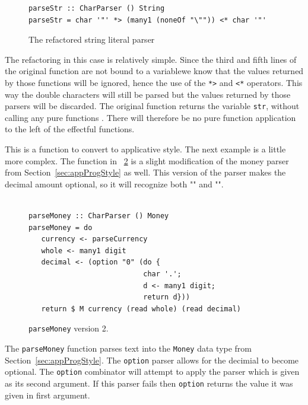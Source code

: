 \begin{figure}[t]
\begin{lstlisting}
parseStr :: CharParser () String
parseStr = char '"' *> (many1 (noneOf "\"")) <* char '"'
\end{lstlisting}
\caption{The refactored string literal parser}
\label{strLit_ref}
\end{figure}

The refactoring in this case is relatively simple. Since the third and fifth lines of the original function are not bound to a variable\DIFaddbegin \DIFadd{, }\DIFaddend we know that the values returned by those functions will be ignored, hence the use of the \texttt{*>} and \texttt{<*} operators. This way the double \DIFdelbegin {}\DIFdelend \DIFaddbegin {}\DIFaddend characters will still be parsed but the values returned by those parsers will be discarded. The original 
function \DIFdelbegin {}\DIFdelend returns the variable \texttt{str}, without calling any pure functions \DIFaddbegin {}\DIFaddend . There will therefore be no pure function application to the left of the effectful functions. 

This is a \DIFdelbegin {}\DIFdelend \DIFaddbegin {}\DIFaddend function to convert to applicative style. The next example is a little more complex. The function in \DIFdelbegin {}\DIFdelend \DIFaddbegin {}\DIFaddend ~\ref{pMoney2} is a slight modification of the money parser from Section~\ref{sec:appProgStyle} as well. This version of the parser makes the decimal amount optional, so it will recognize both "" and "".

\begin{figure}[t]
\begin{lstlisting}

parseMoney :: CharParser () Money
parseMoney = do
   currency <- parseCurrency 
   whole <- many1 digit
   decimal <- (option "0" (do { 
                           char '.';
                           d <- many1 digit;
                           return d}))
   return $ M currency (read whole) (read decimal)
\end{lstlisting}
\caption{\texttt{parseMoney} version 2.}
\label{pMoney2}
\end{figure}

The \texttt{parseMoney} function parses text into the \DIFdelbegin {}\DIFdelend \texttt{Money} data type from Section~\ref{sec:appProgStyle}. The \texttt{option} parser allows for the decimial to become optional. The \texttt{option} combinator will \DIFaddbegin {}\DIFaddend attempt to apply the parser which is given as its second argument\DIFdelbegin {}\DIFdelend . If this parser fails then \texttt{option} returns the value it was given in \DIFdelbegin {}\DIFdelend \DIFaddbegin {}\DIFaddend first argument.

